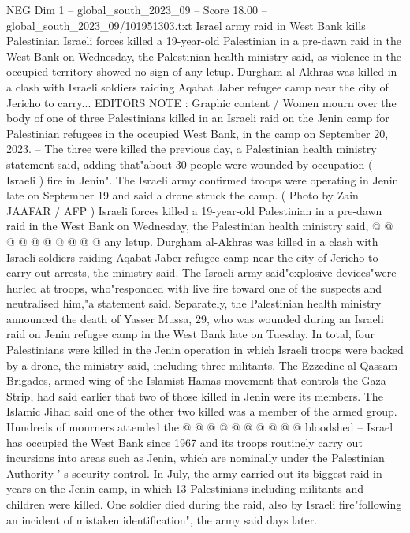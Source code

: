 \begin{textsample}{NEG Dim 1 – global\_south\_2023\_09 – Score 18.00 – global\_south\_2023\_09/101951303.txt}  \label{ex:f1_neg_008}
Israel army raid in West Bank kills Palestinian Israeli forces killed a 19-year-old Palestinian in a pre-dawn raid in the West Bank on Wednesday, the Palestinian health ministry said, as violence in the occupied territory showed no sign of any letup.
Durgham al-Akhras was killed in a clash with Israeli soldiers raiding Aqabat Jaber refugee camp near the city of Jericho to carry...
EDITORS NOTE : Graphic content / Women mourn over the body of one of three Palestinians killed in an Israeli raid on the Jenin camp for Palestinian refugees in the occupied West Bank, in the camp on September 20, 2023. -- The three were killed the previous day, a Palestinian health ministry statement said, adding that"about 30 people were wounded by occupation ( Israeli ) fire in Jenin".
The Israeli army confirmed troops were operating in Jenin late on September 19 and said a drone struck the camp. ( Photo by Zain JAAFAR / AFP ) Israeli forces killed a 19-year-old Palestinian in a pre-dawn raid in the West Bank on Wednesday, the Palestinian health ministry said, @ @ @ @ @ @ @ @ @ @ any letup.
Durgham al-Akhras was killed in a clash with Israeli soldiers raiding Aqabat Jaber refugee camp near the city of Jericho to carry out arrests, the ministry said.
The Israeli army said"explosive devices"were hurled at troops, who"responded with live fire toward one of the suspects and neutralised him,"a statement said.
Separately, the Palestinian health ministry announced the death of Yasser Mussa, 29, who was wounded during an Israeli raid on Jenin refugee camp in the West Bank late on Tuesday.
In total, four Palestinians were killed in the Jenin operation in which Israeli troops were backed by a drone, the ministry said, including three militants.
The Ezzedine al-Qassam Brigades, armed wing of the Islamist Hamas movement that controls the Gaza Strip, had said earlier that two of those killed in Jenin were its members.
The Islamic Jihad said one of the other two killed was a member of the armed group.
Hundreds of mourners attended the @ @ @ @ @ @ @ @ @ @ bloodshed -- Israel has occupied the West Bank since 1967 and its troops routinely carry out incursions into areas such as Jenin, which are nominally under the Palestinian Authority ' s security control.
In July, the army carried out its biggest raid in years on the Jenin camp, in which 13 Palestinians including militants and children were killed.
One soldier died during the raid, also by Israeli fire"following an incident of mistaken identification", the army said days later.

\end{textsample}
